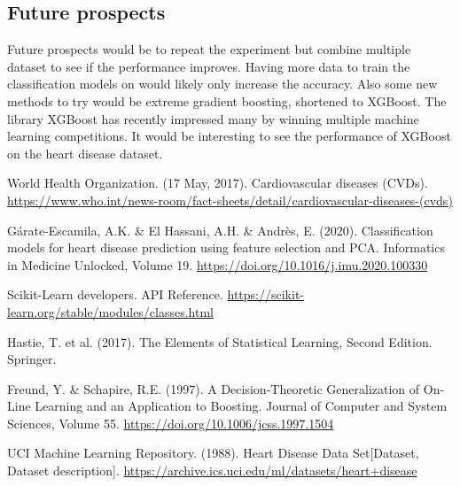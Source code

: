 \documentclass[a4paper,twocolumn]{article}
\begin{document}
\subsection{Future prospects}
Future prospects would be to repeat the experiment but combine multiple dataset to see if the performance improves. Having more data to train the classification models on would likely only increase the accuracy. Also some new methods to try would be extreme gradient boosting, shortened to XGBoost. The library XGBoost has recently impressed many by winning multiple machine learning competitions. It would be interesting to see the performance of XGBoost on the heart disease dataset.
\newpage
\begin{thebibliography}{9}
World Health Organization. (17 May, 2017). Cardiovascular diseases (CVDs). \url{https://www.who.int/news-room/fact-sheets/detail/cardiovascular-diseases-(cvds)}

Gárate-Escamila, A.K. \& El Hassani, A.H. \& Andrès, E. (2020). Classification models for heart disease prediction using feature selection and PCA. Informatics in Medicine Unlocked, Volume 19. \url{https://doi.org/10.1016/j.imu.2020.100330}

Scikit-Learn developers. API Reference. \url{https://scikit-learn.org/stable/modules/classes.html}

Hastie, T. et al. (2017). The Elements of Statistical Learning, Second Edition. Springer. 

Freund, Y. \& Schapire, R.E. (1997). A Decision-Theoretic Generalization of On-Line Learning and an Application to Boosting. Journal of Computer and System Sciences, Volume 55. \url{https://doi.org/10.1006/jcss.1997.1504}

UCI Machine Learning Repository. (1988). Heart Disease Data Set[Dataset, Dataset description]. \url{https://archive.ics.uci.edu/ml/datasets/heart+disease}
\end{thebibliography}
\end{document}
